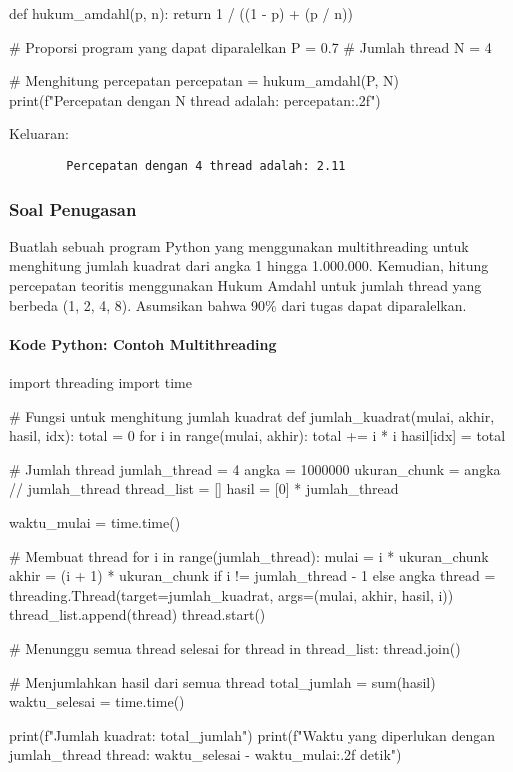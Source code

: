 \documentclass[12pt]{article}
\begin{document}
	\begin{python}
		def hukum_amdahl(p, n):
		return 1 / ((1 - p) + (p / n))
		
		# Proporsi program yang dapat diparalelkan
		P = 0.7
		# Jumlah thread
		N = 4
		
		# Menghitung percepatan
		percepatan = hukum_amdahl(P, N)
		print(f"Percepatan dengan {N} thread adalah: {percepatan:.2f}")
	\end{python}
	
	Keluaran:
	\begin{verbatim}
		Percepatan dengan 4 thread adalah: 2.11
	\end{verbatim}
	
	\subsubsection{Soal Penugasan}
	Buatlah sebuah program Python yang menggunakan multithreading untuk menghitung jumlah kuadrat dari angka 1 hingga 1.000.000. Kemudian, hitung percepatan teoritis menggunakan Hukum Amdahl untuk jumlah thread yang berbeda (1, 2, 4, 8). Asumsikan bahwa 90\% dari tugas dapat diparalelkan.
	
	\paragraph{Kode Python: Contoh Multithreading}
	
	\begin{python}
		import threading
		import time
		
		# Fungsi untuk menghitung jumlah kuadrat
		def jumlah_kuadrat(mulai, akhir, hasil, idx):
		total = 0
		for i in range(mulai, akhir):
		total += i * i
		hasil[idx] = total
		
		# Jumlah thread
		jumlah_thread = 4
		angka = 1000000
		ukuran_chunk = angka // jumlah_thread
		thread_list = []
		hasil = [0] * jumlah_thread
		
		waktu_mulai = time.time()
		
		# Membuat thread
		for i in range(jumlah_thread):
		mulai = i * ukuran_chunk
		akhir = (i + 1) * ukuran_chunk if i != jumlah_thread - 1 else angka
		thread = threading.Thread(target=jumlah_kuadrat, args=(mulai, akhir, hasil, i))
		thread_list.append(thread)
		thread.start()
		
		# Menunggu semua thread selesai
		for thread in thread_list:
		thread.join()
		
		# Menjumlahkan hasil dari semua thread
		total_jumlah = sum(hasil)
		waktu_selesai = time.time()
		
		print(f"Jumlah kuadrat: {total_jumlah}")
		print(f"Waktu yang diperlukan dengan {jumlah_thread} thread: {waktu_selesai - waktu_mulai:.2f} detik")
	\end{python}
	
\end{document}

